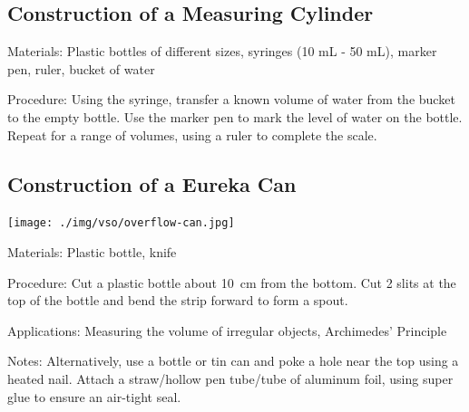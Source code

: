 \begin{multicols}{2}
\subsection{Construction of a Measuring Cylinder}
\label{sub:meascyl}


\begin{description*}
\item[Materials:]{Plastic bottles of different sizes, syringes (10 mL - 50 mL), marker pen, ruler, bucket of water}
\item[Procedure:]{Using the syringe, transfer a known volume of water from the bucket to the empty bottle. Use the marker pen to mark the level of water on the bottle. Repeat for a range of volumes, using a ruler to complete the scale.}
\end{description*}

\subsection{Construction of a Eureka Can}
\label{sub:eurekacan}

\begin{center}
\texttt{[image: ./img/vso/overflow-can.jpg]}
\end{center}

\begin{description*}
\item[Materials:]{Plastic bottle, knife}
\item[Procedure:]{Cut a plastic bottle about 10~cm from the bottom. Cut 2 slits at the top of the bottle and bend the strip forward to form a spout.}
\item[Applications:]{Measuring the volume of irregular objects, Archimedes' Principle}
\item[Notes:]{Alternatively, use a bottle or tin can and poke a hole near the top using a heated nail. Attach a straw/hollow pen tube/tube of aluminum foil, using super glue to ensure an air-tight seal.}
\end{description*}


\end{multicols}
